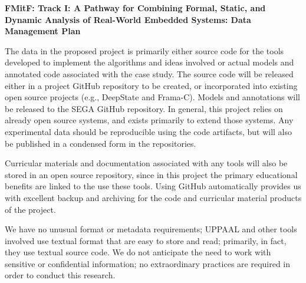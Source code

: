 \documentclass{article}
\begin{document}
\begin{center}
  {\Large\sf\textbf{FMitF: Track I: A Pathway for Combining Formal, Static, and
  Dynamic Analysis of Real-World Embedded Systems: Data Management Plan}}
\end{center}

The data in the proposed project is primarily either source code for
the tools developed to implement the algorithms and ideas involved or
actual models and annotated code associated with the case study.  The source code will be released either in a project GitHub repository to be created, or incorporated into existing open source projects (e.g., DeepState and Frama-C).  Models and annotations will be released to the SEGA GitHub repository.  In general, this project relies on already open source systems, and exists primarily to extend those systems.  Any experimental data should be reproducible using the code artifacts, but will also be published in a condensed form in the repositories.

Curricular
materials and documentation associated with any tools will also be stored in
an open source repository, since in this project the primary
educational benefits are linked to the use these tools.  Using GitHub automatically provides us with excellent backup
and archiving for the code and curricular material products of the
project.

We have no unusual format or metadata requirements; UPPAAL and other
tools involved use textual format that are easy to store and read;
primarily, in fact, they use textual source code.
We do not anticipate the need to work with sensitive or confidential
information; no extraordinary practices are required in order to
conduct this research.
\end{document}
